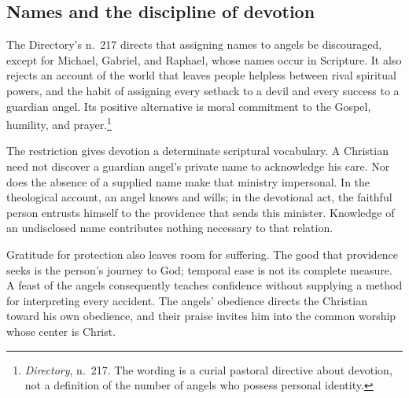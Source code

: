 \subsection{Names and the discipline of devotion}

The Directory's n.~217 directs that assigning names to angels be discouraged,
except for Michael, Gabriel, and Raphael, whose names occur in Scripture.
It also rejects an account of the world that leaves people helpless between
rival spiritual powers, and the habit of assigning every setback to a devil
and every success to a guardian angel. Its positive alternative is moral
commitment to the Gospel, humility, and prayer.\footnote{\emph{Directory},
n.~217. The wording is a curial pastoral directive about devotion, not a
definition of the number of angels who possess personal identity.}

The restriction gives devotion a determinate scriptural vocabulary. A
Christian need not discover a guardian angel's private name to acknowledge
his care. Nor does the absence of a supplied name make that ministry
impersonal. In the theological account, an angel knows and wills; in the
devotional act, the faithful person entrusts himself to the providence that
sends this minister. Knowledge of an undisclosed name contributes nothing
necessary to that relation.

Gratitude for protection also leaves room for suffering. The good that
providence seeks is the person's journey to God; temporal ease is not its
complete measure. A feast of the angels consequently teaches confidence
without supplying a method for interpreting every accident. The angels'
obedience directs the Christian toward his own obedience, and their praise
invites him into the common worship whose center is Christ.
